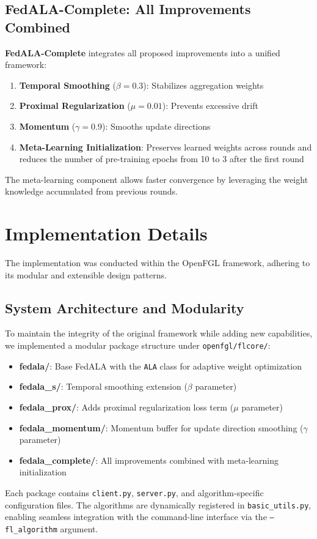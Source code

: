 \documentclass[10pt,conference,compsocconf,letterpaper]{IEEEtran}
\begin{document}
\subsection{FedALA-Complete: All Improvements Combined}
\textbf{FedALA-Complete} integrates all proposed improvements into a unified framework:
\begin{enumerate}
    \item \textbf{Temporal Smoothing} ($\beta=0.3$): Stabilizes aggregation weights
    \item \textbf{Proximal Regularization} ($\mu=0.01$): Prevents excessive drift
    \item \textbf{Momentum} ($\gamma=0.9$): Smooths update directions
    \item \textbf{Meta-Learning Initialization}: Preserves learned weights across rounds and reduces the number of pre-training epochs from 10 to 3 after the first round
\end{enumerate}
The meta-learning component allows faster convergence by leveraging the weight knowledge accumulated from previous rounds.

\section{Implementation Details}

The implementation was conducted within the OpenFGL framework, adhering to its modular and extensible design patterns.

\subsection{System Architecture and Modularity}
To maintain the integrity of the original framework while adding new capabilities, we implemented a modular package structure under \texttt{openfgl/flcore/}:
\begin{itemize}
    \item \textbf{fedala/}: Base FedALA with the \texttt{ALA} class for adaptive weight optimization
    \item \textbf{fedala\_s/}: Temporal smoothing extension ($\beta$ parameter)
    \item \textbf{fedala\_prox/}: Adds proximal regularization loss term ($\mu$ parameter)
    \item \textbf{fedala\_momentum/}: Momentum buffer for update direction smoothing ($\gamma$ parameter)
    \item \textbf{fedala\_complete/}: All improvements combined with meta-learning initialization
\end{itemize}
Each package contains \texttt{client.py}, \texttt{server.py}, and algorithm-specific configuration files. The algorithms are dynamically registered in \texttt{basic\_utils.py}, enabling seamless integration with the command-line interface via the \texttt{--fl\_algorithm} argument.
\end{document}
